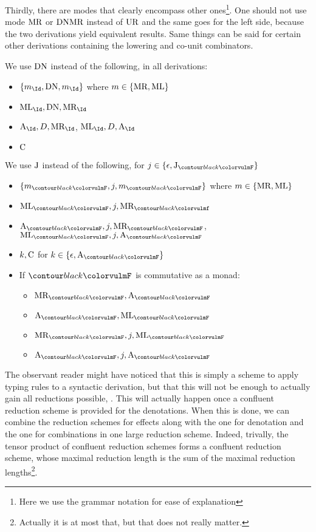 \medskip

Thirdly, there are modes that clearly encompass other ones\footnote{Here we use
	the grammar notation for ease of explanation}.
One should not use mode $\text{MR}$ or $\text{DN} \text{MR}$ instead of $\text{UR}$
and the same goes for the left side, because the two derivations yield
equivalent results.
Same things can be said for certain other derivations containing the lowering
and co-unit combinators.

We use $\text{DN}$ instead of the following, in all derivations:
\begin{itemize}
	\item $\left\{ m_{\Id}, \combDN, m_{\Id}\right\}$ where
	      $m \in \{\text{MR}, \text{ML}\}$
	\item $\combML_{\Id}, \combDN, \combMR_{\Id}$
	\item $\combA_{\Id}, D, \combMR_{\Id}$, $\combML_{\Id}, D, \combA_{\Id}$
	\item $\text{C}$
\end{itemize}
We use $\text{J}$ instead of the following,
for $j \in \{\epsilon, \combJ_{\f{F}}\}$
\begin{itemize}
	\item $\left\{m_{\f{F}}, j, m_{\f{F}}\right\}$ where
	      $m \in \{\text{MR}, \text{ML}\}$
	\item $\combML_{\f{F}}, j, \combMR_{\f{f}}$
	\item $\combA_{\f{F}}, j, \combMR_{\f{F}}$,
	      $\combML_{\f{F}}, j, \combA_{\f{F}}$
	\item $k, \text{C}$ for $k \in \{\epsilon, \combA_{\f{F}}\}$
	\item If $\f{F}$ is commutative as a monad:
	      \begin{itemize}
		      \item $\combMR_{\f{F}}, \combA_{\f{F}}$
		      \item $\combA_{\f{F}}, \combML_{\f{F}}$
		      \item $\combMR_{\f{F}}, j, \combML_{\f{F}}$
		      \item $\combA_{\f{F}}, j, \combA_{\f{F}}$
	      \end{itemize}
\end{itemize}

\medskip

The observant reader might have noticed that this is simply a scheme to apply
typing rules to a syntactic derivation, but that this will not be enough to
actually gain all reductions possible, .
This will actually happen once a confluent reduction scheme is provided for the
denotations.
When this is done, we can combine the reduction schemes for effects along with
the one for denotation and the one for combinations in one large reduction
scheme.
Indeed, trivally, the tensor product of confluent reduction schemes forms a
confluent reduction scheme, whose maximal reduction length is the sum of the
maximal reduction lengths\footnote{Actually it is at most that, but that does
	not	really matter.}.


